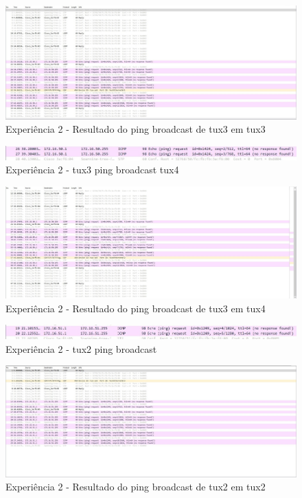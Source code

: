 \begin{figure}[H]
\centering
  \includegraphics[width=\linewidth]{img/exp2-tsk8-tux3-full.jpg}
  \caption{Experiência 2 - Resultado do ping broadcast de tux3 em tux3}
\end{figure}

\begin{figure}[H]
\centering
  \includegraphics[width=\linewidth]{img/exp2-tsk8-tux4.jpg}
  \caption{Experiência 2 - tux3 ping broadcast tux4}
\end{figure}

\begin{figure}[H]
\centering
  \includegraphics[width=\linewidth]{img/exp2-tsk8-tux4-full.jpg}
  \caption{Experiência 2 - Resultado do ping broadcast de tux3 em tux4}
\end{figure}

\begin{figure}[H]
\centering
  \includegraphics[width=\linewidth]{img/exp2-tsk10-tux2.jpg}
  \caption{Experiência 2 - tux2 ping broadcast}
\end{figure}

\begin{figure}[H]
\centering
  \includegraphics[width=\linewidth]{img/exp2-tsk10-tux2-full.jpg}
  \caption{Experiência 2 - Resultado do ping broadcast de tux2 em tux2}
\end{figure}


